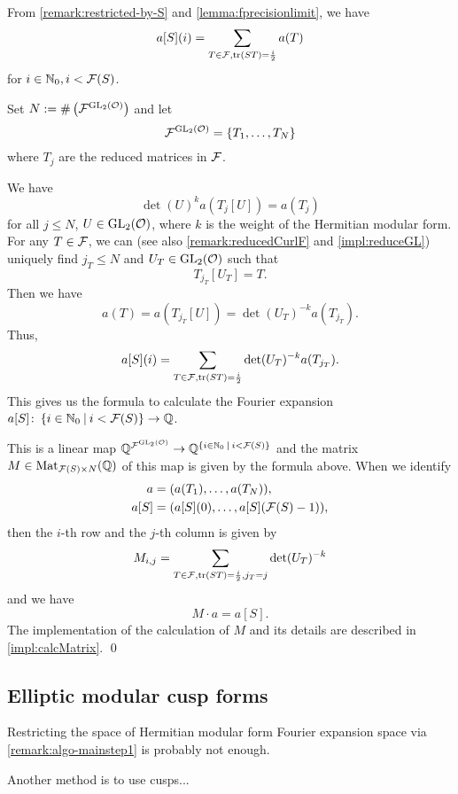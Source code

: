 \begin{remark}
\label{remark:how-to-calc-aS}
From \cref{remark:restricted-by-S} and \cref{lemma:fprecisionlimit}, we have
\[ a[S] (i) = \sum_{T \in \mathcal{F}, \textup{\textrm{tr}}(S T) = \frac{i}{2}} a(T) \]
for $i \in \mathbb{N}_0, i < \mathcal{F}(S)$.

Set $N := \# \left( {\mathcal{F}}^{\operatorname{GL}_2(\mathcal{O})} \right)$ and let
\[ \invarF{\F}{\GL_2(\curlO)} = \Set{T_1, \dots, T_N} \]
where $T_j$ are the reduced matrices in $\mathcal{F}$.

We have
\[ \det(U)^k a(T_j[U]) = a(T_j) \] %
for all $j \le N$, $U \in \operatorname{GL}_2(\mathcal{O})$, where $k$ is the weight of the Hermitian modular form.
For any $T \in \mathcal{F}$, we can (see also \cref{remark:reducedCurlF} and \cref{impl:reduceGL}) uniquely find $j_T \le N$ and $U_T \in \operatorname{GL}_2(\mathcal{O})$ such that
\[ T_{j_T}[U_T] = T. \]
Then we have
\[ a(T) = a(T_{j_T}[U]) = \det(U_T)^{-k} a(T_{j_T}) . \]
Thus,
\[ a[S] (i) =  \sum_{T \in \mathcal{F}, \textup{\textrm{tr}}(S T) = \frac{i}{2}} \det(U_T)^{-k} a(T_{j_T}) . \]
This gives us the formula to calculate the Fourier expansion $a[S] \colon \Set{i \in \N_0}{i < \FPrecisionLimit{S}} \rightarrow \Q$.

This is a linear map $\Q^{\invarF{\F}{\GL_2(\curlO)}} \rightarrow \Q^{\Set{i \in \N_0}{i < \FPrecisionLimit{S}}}$ and the matrix $M \in \operatorname{Mat}_{\mathcal{F}(S) \times N}(\mathbb{Q})$ of this map is given by the formula above. When we identify
\begin{align*}
a = & \; (a(T_1), \dots, a(T_N)), \\
a[S] = & \; (a[S](0), \dots, a[S](\mathcal{F}(S) - 1)),
\end{align*}
then the $i$-th row and the $j$-th column is given by
\[ M_{i,j} =  \sum_{T \in \mathcal{F}, \textup{\textrm{tr}}(S T) = \frac{i}{2}, j_T = j} \det(U_T)^{-k} \]
and we have
\[ M \cdot a = a[S] . \]
The implementation of the calculation of $M$ and its details are described in \cref{impl:calcMatrix}.
\qed
\end{remark}


\subsection{Elliptic modular cusp forms}

Restricting the space of Hermitian modular form Fourier expansion space via \cref{remark:algo-mainstep1} is probably not enough. %

Another method is to use cusps...

